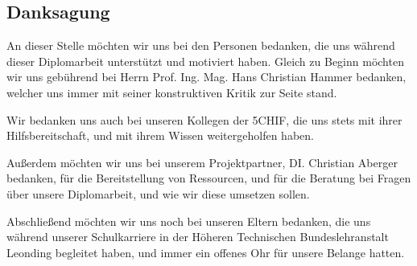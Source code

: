 \begin{spacing}{1}
    \chapter*{Danksagung}
\end{spacing}
An dieser Stelle möchten wir uns bei den Personen bedanken, die uns während dieser
Diplomarbeit unterstützt und motiviert haben.
Gleich zu Beginn möchten wir uns gebührend bei Herrn Prof. Ing. Mag. Hans Christian Hammer bedanken, welcher uns immer mit seiner konstruktiven Kritik zur Seite
stand.

Wir bedanken uns auch bei unseren Kollegen der 5CHIF, die uns stets mit ihrer
Hilfsbereitschaft, und mit ihrem Wissen weitergeholfen haben.

Außerdem möchten wir uns bei unserem Projektpartner, DI. Christian Aberger
bedanken, für die Bereitstellung von Ressourcen, und für die Beratung bei Fragen
über unsere Diplomarbeit, und wie wir diese umsetzen sollen.

Abschließend möchten wir uns noch bei unseren Eltern bedanken, die uns während
unserer Schulkarriere in der Höheren Technischen Bundeslehranstalt Leonding begleitet
haben, und immer ein offenes Ohr für unsere Belange hatten.
